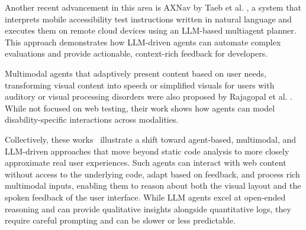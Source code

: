 Another recent advancement in this area is AXNav by Taeb et al. \cite{taeb2024axnav}, a system that interprets mobile accessibility test instructions written in natural language and executes them on remote cloud devices using an LLM-based multiagent planner. This approach demonstrates how LLM-driven agents can automate complex evaluations and provide actionable, context-rich feedback for developers.

Multimodal agents that adaptively present content based on user needs, transforming visual content into speech or simplified visuals for users with auditory or visual processing disorders were also proposed by Rajagopal et al. \cite{rajagopal2023design}. While not focused on web testing, their work shows how agents can model disability-specific interactions across modalities.

Collectively, these works~\cite{lanham2025ai, wang2024survey, lu2025uxagent} illustrate a shift toward agent-based, multimodal, and LLM-driven approaches that move beyond static code analysis to more closely approximate real user experiences. Such agents can interact with web content without access to the underlying code, adapt based on feedback, and process rich multimodal inputs, enabling them to reason about both the visual layout and the spoken feedback of the user interface. While LLM agents excel at open-ended reasoning and can provide qualitative insights alongside quantitative logs, they require careful prompting and can be slower or less predictable.

\vspace{-4pt}